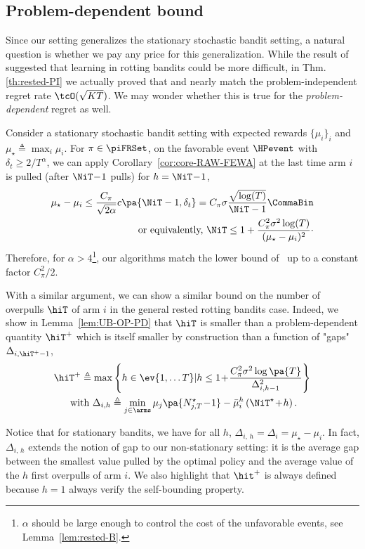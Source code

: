 \subsection{Problem-dependent bound}
\label{ss:rested-PD}
Since our setting generalizes the stationary stochastic bandit setting, a natural question is whether we pay any price for this generalization. While the result of~\citet{levine2017rotting} suggested that learning in rotting bandits could be more difficult, in Thm.\,\ref{th:rested-PI} we actually proved that \FEWA and \RUCB nearly match the problem-independent regret rate $\tcO(\sqrt{KT})$. We may wonder whether this is true for the \emph{problem-dependent} regret as well.
%
\begin{remark}
Consider a stationary stochastic bandit setting with expected rewards $\{\mu_i\}_i $ and $\mu_\star \triangleq \max_i \mu_i$. For $\pi \in \piFRSet$, on the favorable event $\HPevent$ with $\delta_t \geq 2/T^\alpha$,  we can apply Corollary~\ref{cor:core-RAW-FEWA}  at the last time arm $i$ is pulled (\ie after $\NiT\!-\!1$ pulls) for $h = \NiT\!-\!1$, 
\begin{align}
\mu_\star - \mu_i \leq \frac{C_\pi}{\sqrt{2\alpha}} c\pa{\NiT-1,  \delta_t} = C_\pi\sigma \frac{\sqrt{\log(T)}}{\NiT -1} \CommaBin\nonumber \\
\text{\ or equivalently,\ }
\NiT \leq 1+ \frac{C_\pi^2 \sigma^2 \log(T)}{(\mu_{\star} - \mu_i) ^2}\cdot\label{eq:LaiRob}
\end{align}
Therefore, for $\alpha > 4$\footnote{$\alpha$ should be large enough to control the cost of the unfavorable events, see Lemma~\ref{lem:rested-B}.}, our algorithms match the lower bound of~\citet{lai1985asymptotically} up to a constant factor $C_\pi^2/2$.
\end{remark}
%
With a similar argument, we can show a similar bound on the number of overpulls $\hiT$  of arm $i$ in the general rested rotting bandits case. Indeed, we show in Lemma~\ref{lem:UB-OP-PD} that $\hiT$ is smaller than a problem-dependent quantity $\hiT^+$ which is itself smaller by construction than a function of "gaps" $\Delta_{i,\hiT^+-1}$,
%
\begin{multline}
\label{eq:hit+}
\hiT^+ \triangleq \max \left\{h \in \ev{1, \dots T} |  h \leq 
1 \! + \! \frac{C_\pi^2 \sigma^2 \log \pa{T}}{\Delta_{i,h-1}^2} \right\}\\\text{ with  } \Delta_{i,h} \triangleq \min_{j \in \arms} \mu_j\pa{N_{j,T}^\star \!-\!1} - \bar{\mu}_i^h\left( \NiT^\star \!+\!h \right). 
\end{multline}
\begin{remark}
Notice that for stationary bandits, we have for all $h$, $\Delta_{i,\,h} = \Delta_i = \mu_\star - \mu_i$. In fact, $ \Delta_{i,\,h} $ extends the notion of gap to our non-stationary setting: it is the average gap between the smallest value pulled by the optimal policy and the average value of the $h$ first overpulls of arm $i$.  We also highlight that $\hit^+$ is always defined because $h=1$ always verify the self-bounding property. 
\end{remark}


